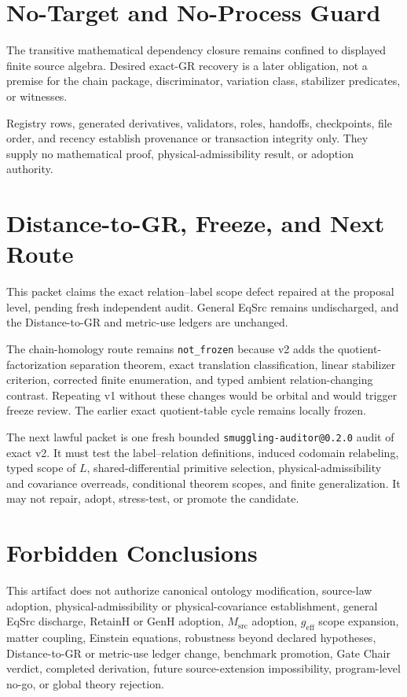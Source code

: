 \documentclass[11pt]{article}
\begin{document}
\section{No-Target and No-Process Guard}

The transitive mathematical dependency closure remains confined to displayed
finite source algebra. Desired exact-GR recovery is a later obligation, not a
premise for the chain package, discriminator, variation class, stabilizer
predicates, or witnesses.

Registry rows, generated derivatives, validators, roles, handoffs,
checkpoints, file order, and recency establish provenance or transaction
integrity only. They supply no mathematical proof, physical-admissibility
result, or adoption authority.

\section{Distance-to-GR, Freeze, and Next Route}

This packet claims the exact relation--label scope defect repaired at the
proposal level, pending fresh independent audit. General EqSrc remains
undischarged, and the Distance-to-GR and metric-use ledgers are unchanged.

The chain-homology route remains \texttt{not\_frozen} because v2 adds the
quotient-factorization separation theorem, exact translation classification,
linear stabilizer criterion, corrected finite enumeration, and typed ambient
relation-changing contrast. Repeating v1 without these changes would be
orbital and would trigger freeze review. The earlier exact quotient-table
cycle remains locally frozen.

The next lawful packet is one fresh bounded
\texttt{smuggling-auditor@0.2.0} audit of exact v2. It must test the
label--relation definitions, induced codomain relabeling, typed scope of
\(L\), shared-differential primitive selection, physical-admissibility and
covariance overreads, conditional theorem scopes, and finite generalization.
It may not repair, adopt, stress-test, or promote the candidate.

\section{Forbidden Conclusions}

This artifact does not authorize canonical ontology modification, source-law
adoption, physical-admissibility or physical-covariance establishment,
general EqSrc discharge, RetainH or GenH adoption, \(M_{\mathrm{src}}\)
adoption, \(g_{\mathrm{eff}}\) scope expansion, matter coupling, Einstein
equations, robustness beyond declared hypotheses, Distance-to-GR or
metric-use ledger change, benchmark promotion, Gate Chair verdict, completed
derivation, future source-extension impossibility, program-level no-go, or
global theory rejection.
\end{document}
